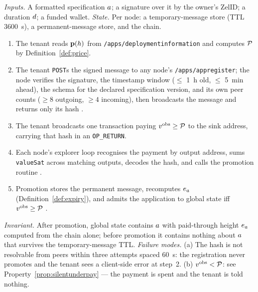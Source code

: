 \begin{construction}
\label{alg:settle}
\emph{Inputs.} A formatted specification $a$; a signature over it by the owner's ZelID; a duration
$d$; a funded wallet.\quad
\emph{State.} Per node: a temporary-message store (TTL \qty{3600}{\second}), a permanent-message
store, and the chain.
\begin{enumerate}\setlength{\itemsep}{1pt}
\item The tenant reads $\mathbf{p}(h)$ from \texttt{/\allowbreak{}apps/\allowbreak{}deploymentinformation} and computes
      $\mathcal{P}$ by Definition~\ref{def:price}.
\item The tenant \texttt{POST}s the signed message to any node's \texttt{/\allowbreak{}apps/\allowbreak{}appregister}; the node
      verifies the signature, the timestamp window ($\le$ \qty{1}{\hour} old, $\le$ \qty{5}{\minute}
      ahead), the schema for the declared specification version, and its own peer counts
      ($\ge 8$ outgoing, $\ge 4$ incoming), then broadcasts the message and returns only its hash
      .
\item The tenant broadcasts one transaction paying $v^{\mathrm{obs}} \ge \mathcal{P}$ to the sink address,
      carrying that hash in an \texttt{OP\_RETURN}.
\item Each node's explorer loop recognises the payment by output address, sums \texttt{valueSat}
      across matching outputs, decodes the hash, and calls the promotion routine
      .
\item Promotion stores the permanent message, recomputes $e_{a}$ (Definition~\ref{def:expiry}), and
      admits the application to global state iff $v^{\mathrm{obs}} \ge \mathcal{P}$
      .
\end{enumerate}
\emph{Invariant.} After promotion, global state contains $a$ with paid-through height $e_{a}$
computed from the chain alone; before promotion it contains nothing about $a$ that survives the
temporary-message TTL.\quad
\emph{Failure modes.} (a) The hash is not resolvable from peers within three attempts spaced
\qty{60}{\second}: the registration never promotes and the tenant sees a client-side error at step~2.
(b) $v^{\mathrm{obs}} < \mathcal{P}$: see Property~\ref{prop:silentunderpay} --- the payment is spent and
the tenant is told nothing.
\end{construction}

